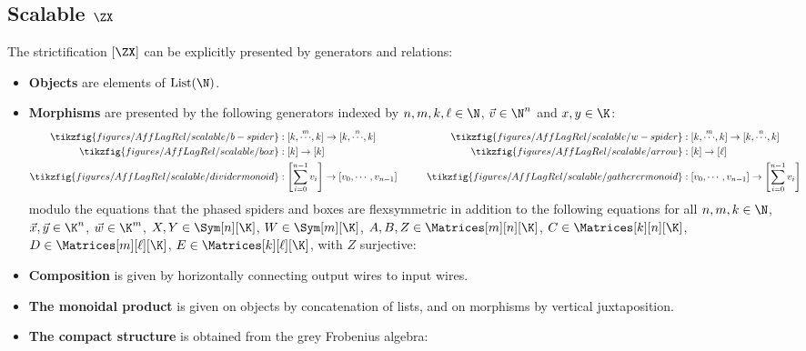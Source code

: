 \subsection{Scalable  \texorpdfstring{\(\ZX\)}{GSA}}
\label{ssec:axioms_scalable}
\begin{definition}
  The strictification \([\ZX]\) can be explicitly presented by generators
  and relations:
  \begin{itemize}
  \item \textbf{Objects} are elements of  \(\operatorname{List}(\N)\).
  \item \textbf{Morphisms} are presented by the following generators indexed
  by \(n,m,k, \ell \in \N\), \(\vec v \in \N^n\) and \(x,y\in \K\):
  \begin{align*}
    \tikzfig{figures/AffLagRel/scalable/b-spider} &: [k, \overset{m}{\cdots}, k] \to [k, \overset{n}{\cdots}, k]&
    \quad\quad
    \tikzfig{figures/AffLagRel/scalable/w-spider}  &: [k, \overset{m}{\cdots}, k] \to [k, \overset{n}{\cdots}, k] &
    \\
    \tikzfig{figures/AffLagRel/scalable/box} &: [k] \to [k] &
    \quad\quad
    \tikzfig{figures/AffLagRel/scalable/arrow} &: [k] \to [\ell] &
    \\
    \tikzfig{figures/AffLagRel/scalable/dividermonoid} &: \left[\sum_{i=0}^{n-1}v_i\right] \to [v_0,\cdots, v_{n-1}] &
    \quad\quad
    \tikzfig{figures/AffLagRel/scalable/gatherermonoid} &: [v_0,\cdots, v_{n-1}]   \to \left[\sum_{i=0}^{n-1}v_i \right] &
  \end{align*}
  modulo the equations that the phased spiders and boxes are flexsymmetric in addition to the following equations for all \(n,m,k \in \N\),  \(\vec x,\vec y \in \K^n\), \(\vec w \in \K^m\), \(X,Y\in\Sym[n][\K]\), \(W \in \Sym[m][\K]\),  \(A,B,Z\in \Matrices[m][n][\K]\), \(C\in \Matrices[k][n][\K]\), \(D\in \Matrices[m][\ell][\K]\), \(E\in \Matrices[k][\ell][\K]\),  with \(Z\) surjective:\\
  \begin{figure}[H]
  \end{figure}
  \item \textbf{Composition} is given by horizontally connecting output wires
  to input wires.
  \item \textbf{The monoidal product} is given on objects by concatenation of lists,
  and on morphisms by vertical juxtaposition.
  \item \textbf{The compact structure} is obtained from the grey Frobenius algebra:

\end{itemize}
\end{definition}
